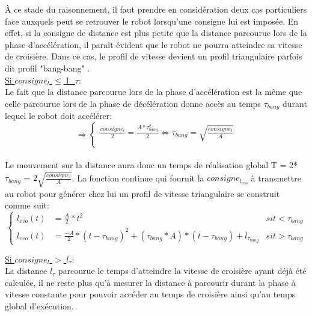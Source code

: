 \documentclass[a4paper,11pt]{article}
\begin{document}
À ce stade du raisonnement, il faut prendre en considération deux cas particuliers face auxquels peut se retrouver le robot lorsqu'une consigne lui est imposée. En effet, si la consigne de distance est plus petite que la distance parcourue lors de la phase d'accélération, il paraît évident que le robot ne pourra atteindre sa vitesse de croisière. Dans ce cas, le profil de vitesse devient un profil triangulaire parfois dit profil "bang-bang" \cite{chemori_generation_nodate}.\\

\underline{Si $consigne_{l}$ $\leq$ l_{$\tau$}}:\\

Le fait que la distance parcourue lors de la phase d'accélération est la même que celle parcourue lors de la phase de décélération donne accès au temps $\tau_{bang}$ durant lequel le robot doit accélérer:
\begin{equation*}
    \Rightarrow\left\{
        \begin{aligned}
        \frac{consigne_{l}}{2} = \frac{A*\tau_{bang}^2}{2} \Leftrightarrow \tau_{bang} = \sqrt{\frac{consigne_{l}}{A}}\\
           \end{aligned}
    \right.
\end{equation*}\\
Le mouvement sur la distance aura donc un temps de réalisation global T = 2*$\tau_{bang}$ = $2\sqrt{\frac{consigne_{l}}{A}}$. La fonction continue qui fournit la $consigne_{l_{evo}}$ à transmettre au robot pour générer chez lui un profil de vitesse triangulaire se construit comme suit:
\begin{equation*}
    \left\{
        \begin{aligned}
        l_{evo}(t) & = \frac{A}{2}*t^2 &si t<\tau_{bang}\\
        l_{evo}(t) & = \frac{-A}{2}*(t-\tau_{bang})^2 + (\tau_{bang}*A) *( t-\tau_{bang}) + l_{\tau_{bang}} &si t>\tau_{bang}
        \end{aligned}
    \right.
\end{equation*}

\underline{Si $consigne_{l}$ $>$ $l_{\tau}$}:\\

La distance $l_{\tau}$ parcourue le temps d'atteindre la vitesse de croisière ayant déjà été calculée, il ne reste plus qu'à mesurer la distance à parcourir durant la phase à vitesse constante pour pouvoir accéder au temps de croisière ainsi qu'au temps global d'exécution.
\end{document}
